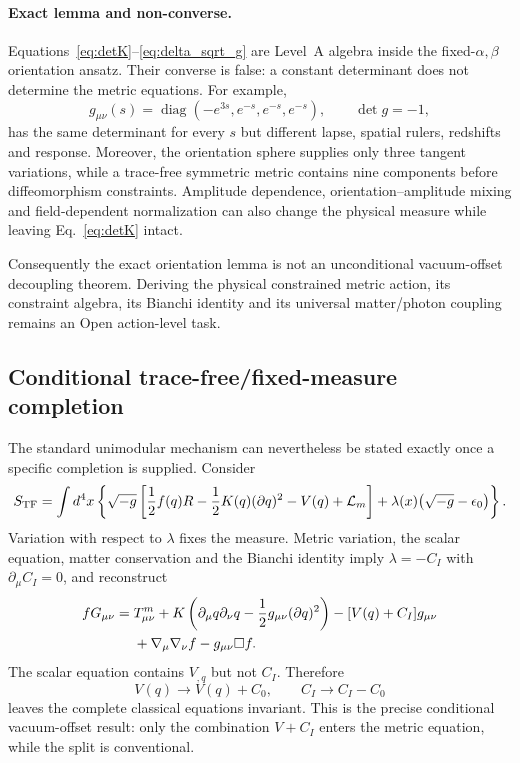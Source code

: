 \paragraph{Exact lemma and non-converse.}
\label{thm:cc_decoupling}%
Equations~\eqref{eq:detK}--\eqref{eq:delta_sqrt_g} are Level~A algebra
inside the fixed-$\alpha,\beta$ orientation ansatz.  Their converse is
false: a constant determinant does not determine the metric equations.  For
example,
\begin{equation}
 g_{\mu\nu}(s)=\operatorname{diag}
 (-e^{3s},e^{-s},e^{-s},e^{-s}),\qquad \det g=-1,
 \label{eq:A_decoupling}
\end{equation}
has the same determinant for every $s$ but different lapse, spatial rulers,
redshifts and response.  Moreover, the orientation sphere supplies only
three tangent variations, while a trace-free symmetric metric contains nine
components before diffeomorphism constraints.  Amplitude dependence,
orientation--amplitude mixing and field-dependent normalization can also
change the physical measure while leaving Eq.~\eqref{eq:detK} intact.

Consequently the exact orientation lemma is not an unconditional
vacuum-offset decoupling theorem.  Deriving the physical constrained metric
action, its constraint algebra, its Bianchi identity and its universal
matter/photon coupling remains an Open action-level task.

\subsection{Conditional trace-free/fixed-measure completion}
\label{subsec:unimodular_cc}

The standard unimodular mechanism can nevertheless be stated exactly once a
specific completion is supplied.  Consider
\begin{equation}
 S_{\rm TF}=\int d^4x\left\{\sqrt{-g}\left[
 {1\over2}f(q)R-{1\over2}K(q)(\partial q)^2-V(q)
 +\mathcal L_m\right]
 +\lambda(x)\bigl(\sqrt{-g}-\epsilon_0\bigr)\right\}.
 \label{eq:full_quadratic_cc}
\end{equation}
Variation with respect to $\lambda$ fixes the measure.  Metric variation,
the scalar equation, matter conservation and the Bianchi identity imply
$\lambda=-C_I$ with $\partial_\mu C_I=0$, and reconstruct
\begin{align}
 fG_{\mu\nu}={}&T^m_{\mu\nu}
 +K\left(\partial_\mu q\partial_\nu q
 -{1\over2}g_{\mu\nu}(\partial q)^2\right)
 -[V(q)+C_I]g_{\mu\nu}\nonumber\\
 &+\nabla_\mu\nabla_\nu f-g_{\mu\nu}\Box f.
 \label{eq:H1_cc}
\end{align}
The scalar equation contains $V_{,q}$ but not $C_I$.  Therefore
\begin{equation}
 V(q)\longrightarrow V(q)+C_0,
 \qquad C_I\longrightarrow C_I-C_0
 \label{eq:B_decoupling}
\end{equation}
leaves the complete classical equations invariant.  This is the precise
conditional vacuum-offset result: only the combination $V+C_I$ enters the
metric equation, while the split is conventional.

